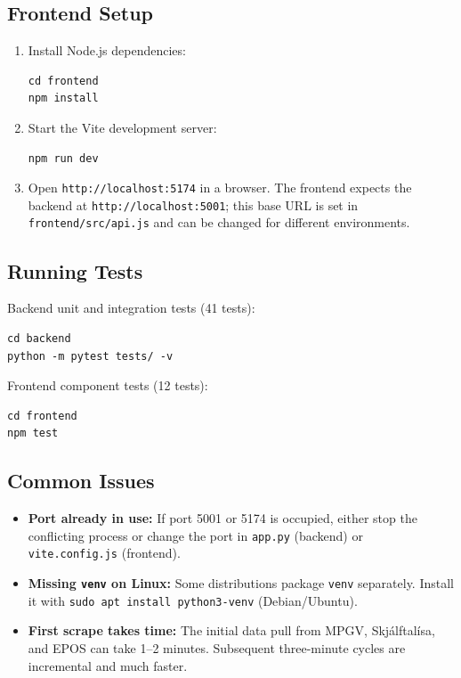 \documentclass[12pt]{article}
\begin{document}
\subsection*{Frontend Setup}

\begin{enumerate}
    \item Install Node.js dependencies:
\begin{verbatim}
cd frontend
npm install
\end{verbatim}

    \item Start the Vite development server:
\begin{verbatim}
npm run dev
\end{verbatim}

    \item Open \texttt{http://localhost:5174} in a browser. The frontend expects the backend at \texttt{http://localhost:5001}; this base URL is set in \texttt{frontend/src/api.js} and can be changed for different environments.
\end{enumerate}

\subsection*{Running Tests}

Backend unit and integration tests (41 tests):
\begin{verbatim}
cd backend
python -m pytest tests/ -v
\end{verbatim}

Frontend component tests (12 tests):
\begin{verbatim}
cd frontend
npm test
\end{verbatim}

\subsection*{Common Issues}

\begin{itemize}
    \item \textbf{Port already in use:} If port 5001 or 5174 is occupied, either stop the conflicting process or change the port in \texttt{app.py} (backend) or \texttt{vite.config.js} (frontend).
    \item \textbf{Missing \texttt{venv} on Linux:} Some distributions package \texttt{venv} separately. Install it with \texttt{sudo apt install python3-venv} (Debian/Ubuntu).
    \item \textbf{First scrape takes time:} The initial data pull from MPGV, Skjálftalísa, and EPOS can take 1--2 minutes. Subsequent three-minute cycles are incremental and much faster.
\end{itemize}
\end{document}
